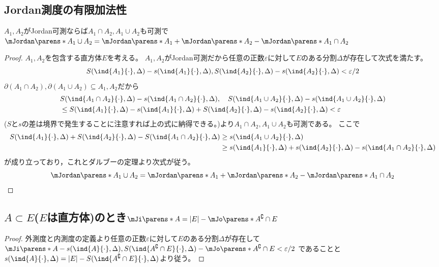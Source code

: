         \subsection{Jordan測度の有限加法性}
            \begin{shadebox}
                $A_1,A_2$がJordan可測ならば$A_1\cap A_2,A_1\cup A_2$も可測で$\mJordan\parens*{A_1\cup A_2} = \mJordan\parens*{A_1} + \mJordan\parens*{A_2} - \mJordan\parens*{A_1\cap A_2}$
            \end{shadebox}
            \begin{proof}
                $A_1,A_2$を包含する直方体$E$を考える。
                $A_1,A_2$がJordan可測だから任意の正数$\varepsilon$に対して$E$のある分割$\Delta$が存在して次式を満たす。
                \[ S(\ind{A_1}{\cdot},\Delta) - s(\ind{A_1}{\cdot},\Delta), S(\ind{A_2}{\cdot},\Delta) - s(\ind{A_2}{\cdot},\Delta) < \varepsilon/2 \]
                $\partial(A_1\cap A_2),\partial(A_1\cup A_2) \subseteq A_1, A_2$だから
                \begin{align*}
                    &S(\ind{A_1\cap A_2}{\cdot},\Delta) - s(\ind{A_1\cap A_2}{\cdot},\Delta),\quad S(\ind{A_1\cup A_2}{\cdot},\Delta) - s(\ind{A_1\cup A_2}{\cdot},\Delta) \\
                    &\leq S(\ind{A_1}{\cdot},\Delta) - s(\ind{A_1}{\cdot},\Delta) + S(\ind{A_2}{\cdot},\Delta) - s(\ind{A_2}{\cdot},\Delta) < \varepsilon
                \end{align*}
                ($S$と$s$の差は境界で発生することに注意すれば上の式に納得できる。)より$A_1\cap A_2,A_1\cup A_2$も可測である。
                ここで
                \begin{align*}
                    S(\ind{A_1}{\cdot},\Delta) + S(\ind{A_2}{\cdot},\Delta) - S(\ind{A_1\cap A_2}{\cdot},\Delta) &\geq s(\ind{A_1\cup A_2}{\cdot},\Delta) \\
                    &\geq s(\ind{A_1}{\cdot},\Delta) + s(\ind{A_2}{\cdot},\Delta) - s(\ind{A_1\cap A_2}{\cdot},\Delta)
                \end{align*}
                が成り立っており，これとダルブーの定理より次式が従う。
                \[ \mJordan\parens*{A_1\cup A_2} = \mJordan\parens*{A_1} + \mJordan\parens*{A_2} - \mJordan\parens*{A_1\cap A_2} \]
            \end{proof}
        \subsection{\texorpdfstring{$A\subset E$}{A⊂E}(\texorpdfstring{$E$}{E}は直方体)のとき\texorpdfstring{$\mJi\parens*{A} = |E| - \mJo\parens*{A^\complement\cap E}$}{mJi(A) = |E| - mJo(A\string^∁ ∩ E)}}
            \begin{proof}
                外測度と内測度の定義より任意の正数$\varepsilon$に対して$E$のある分割$\Delta$が存在して$\mJi\parens*{A} - s(\ind{A}{\cdot},\Delta),S(\ind{A^\complement\cap E}{\cdot},\Delta) - \mJo\parens*{A^\complement\cap E} < \varepsilon/2$
                であることと$s(\ind{A}{\cdot},\Delta) = |E| - S(\ind{A^\complement\cap E}{\cdot},\Delta)$より従う。
            \end{proof}
